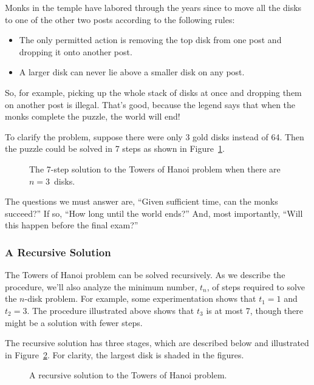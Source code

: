 Monks in the temple have labored through the years since to move all
the disks to one of the other two posts according to the following
rules:
\begin{itemize}
\item The only permitted action is removing the top disk from one post
and dropping it onto another post.
\item A larger disk can never lie above a smaller disk on any post.
\end{itemize}
So, for example, picking up the whole stack of disks at once
and dropping them on another post is illegal.  That's good, because
the legend says that when the monks complete the puzzle, the world
will end!

To clarify the problem, suppose there were only 3 gold disks instead
of 64.  Then the puzzle could be solved in 7 steps as shown in
Figure~\ref{fig:10A2}.

\begin{figure}


\caption{The 7-step solution to the Towers of Hanoi problem when there
are $n = 3$~disks.}

\label{fig:10A2}

\end{figure}

The questions we must answer are, ``Given sufficient time, can the
monks succeed?''  If so, ``How long until the world ends?''  And, most
importantly, ``Will this happen before the final exam?''

\subsubsection{A Recursive Solution}

The Towers of Hanoi problem can be solved recursively.  As we describe
 the procedure, we'll also analyze the minimum number, $t_n$, of steps
required to solve the $n$-disk problem.  For example, some
experimentation shows that $t_1 = 1$ and $t_2 = 3$.  The procedure
illustrated above shows that $t_3$ is at most 7, though there might be
a solution with fewer steps.

The recursive solution has three stages, which are described below and
illustrated in Figure~\ref{fig:10A3}.
For clarity, the largest disk is shaded in the figures.

\begin{figure}


\caption{A recursive solution to the Towers of Hanoi problem.}

\label{fig:10A3}

\end{figure}

